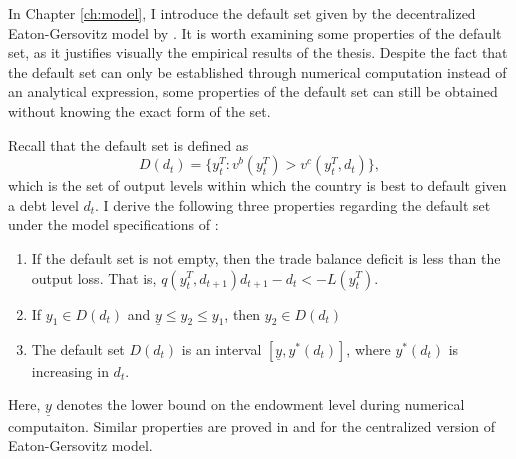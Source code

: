 In Chapter \ref{ch:model}, I introduce the default set given by the decentralized Eaton-Gersovitz model by \citet{Na-18}.
It is worth examining some properties of the default set, as it justifies visually the empirical results of the thesis.
Despite the fact that the default set can only be established through numerical computation instead of an analytical expression, some properties of the default set can still be obtained without knowing the exact form of the set.

\newcommand{\yT}{y^T_{t}}
\newcommand{\yTpr}{y^T_{t+1}}
\newcommand{\dpr}{d_{t+1}}
Recall that the default set is defined as
\begin{equation*}
    D(d_t) = \{\yT : v^b(\yT) > v^c(\yT, d_t)\},
\end{equation*}
which is the set of output levels within which the country is best to default given a debt level $d_t$.
I derive the following three properties regarding the default set under the model specifications of \citet{Na-18}:
\begin{enumerate}
    \item If the default set is not empty, then the trade balance deficit  is less than the output loss. That is, $q(\yT, \dpr)\dpr - d_t < -L(\yT)$.
    \item If $y_1 \in D(d_t)$ and $\underline{y}\le y_2 \le y_1$, then $y_2 \in D(d_t)$
    \item The default set $D(d_t)$ is an interval $[\underline{y}, y^*(d_t)]$, where $y^*(d_t)$ is increasing in $d_t$.
\end{enumerate}
Here, $\underline{y}$ denotes the lower bound on the endowment level during numerical computaiton.
Similar properties are proved in \citet*{Arellano-08} and \citet*{Uribe-Schmitt-Grohe-textbook} for the centralized version of Eaton-Gersovitz model.

